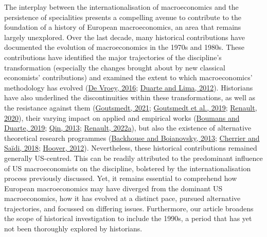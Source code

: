 \documentclass[
  12pt,
  onecolumn]{article}
\begin{document}
The interplay between the internationalisation of macroeconomics and the persistence of specialities presents a compelling avenue to contribute to the foundation of a history of European macroeconomics, an area that remains largely unexplored. Over the last decade, many historical contributions have documented the evolution of macroeconomics in the 1970s and 1980s. These contributions have identified the major trajectories of the discipline's transformation (especially the changes brought about by new classical economists' contributions) and examined the extent to which macroeconomics' methodology has evolved (\protect\hyperlink{ref-devroey2016}{De Vroey, 2016}; \protect\hyperlink{ref-duartelima2012a}{Duarte and Lima, 2012}). Historians have also underlined the discontinuities within these transformations, as well as the resistance against them (\protect\hyperlink{ref-goutsmedt2021b}{Goutsmedt, 2021}; \protect\hyperlink{ref-goutsmedtetal2019}{Goutsmedt et al., 2019}; \protect\hyperlink{ref-renault2020a}{Renault, 2020}), their varying impact on applied and empirical works (\protect\hyperlink{ref-boumans2019}{Boumans and Duarte, 2019}; \protect\hyperlink{ref-qin2013a}{Qin, 2013}; \protect\hyperlink{ref-renault2022}{Renault, 2022a}), but also the existence of alternative theoretical research programmes (\protect\hyperlink{ref-backhouseboianovski2013}{Backhouse and Boianovsky, 2013}; \protect\hyperlink{ref-cherrier2018c}{Cherrier and Saïdi, 2018}; \protect\hyperlink{ref-hoover2012}{Hoover, 2012}). Nevertheless, these historical contributions remained generally US-centred. This can be readily attributed to the predominant influence of US macroeconomists on the discipline, bolstered by the internationalisation process previously discussed. Yet, it remains essential to comprehend how European macroeconomics may have diverged from the dominant US macroeconomics, how it has evolved at a distinct pace, pursued alternative trajectories, and focussed on differing issues. Furthermore, our article broadens the scope of historical investigation to include the 1990s, a period that has yet not been thoroughly explored by historians.
\end{document}
